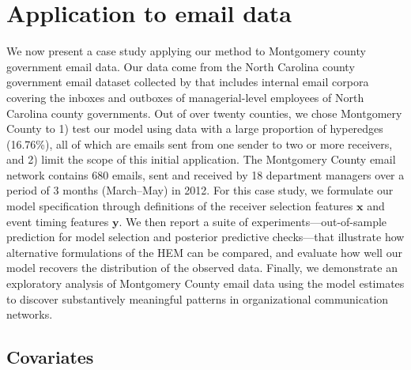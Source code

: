 \documentclass[ba]{imsart}
\numberwithin{equation}{section}
\theoremstyle{plain}
\begin{document}
	\section{Application to email data}\label{sec:Emails}
	We now present a case study applying our method to Montgomery county government email data.
	Our data come from the North Carolina county government email dataset collected by \cite{ben2017transparency} that includes internal email corpora covering the inboxes and outboxes of managerial-level employees of North Carolina county governments. Out of over twenty counties, we chose Montgomery County to 1) test our model using data with a large proportion of hyperedges (16.76\%), all of which are emails sent from one sender to two or more receivers, and 2) limit the scope of this initial application. The Montgomery County email network contains 680 emails, sent and received by 18 department managers over a period of 3 months (March--May) in 2012. For this case study,
	we formulate our model specification through definitions of the receiver selection features $\boldsymbol{x}$ and event timing features $\boldsymbol{y}$. We then report a suite of experiments---out-of-sample prediction for model selection and posterior predictive checks---that illustrate how alternative formulations of the HEM can be compared, and evaluate how well our model recovers the distribution of the observed data. Finally, we demonstrate an exploratory analysis of Montgomery County email data using the model estimates to discover substantively meaningful patterns in organizational communication networks.
	\subsection{Covariates}\label{subsec:Covariates_email}
\end{document}
